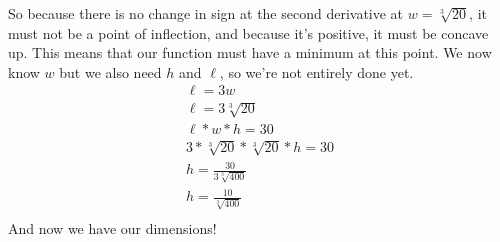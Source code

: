 \documentclass[../revisedmain.tex]{subfiles}
\begin{document}
	So because there is no change in sign at the second derivative at $w=\sqrt[3]{20}$, it must not be a point of inflection, and because it's positive, it must be concave up. This means that our function must have a minimum at this point. We now know $w$ but we also need $h$ and $\ell$, so we're not entirely done yet.
	\begin{gather*}
		\ell=3w\\
		\ell=3\sqrt[3]{20}\\
		\ell*w*h=30\\
		3*\sqrt[3]{20}*\sqrt[3]{20}*h=30\\
		h=\frac{30}{3\sqrt[3]{400}}\\
		h=\frac{10}{\sqrt[3]{400}}\\
	\end{gather*}
	And now we have our dimensions!\\
\end{document}
